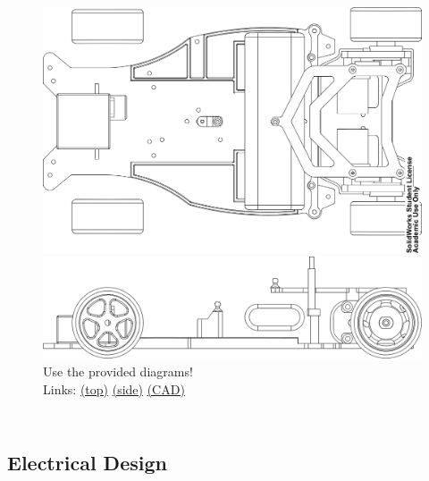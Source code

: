 \documentclass{beamer}
\begin{document}
\begin{frame}
\begin{columns}[t]
\begin{figure}
  \centering
  \includegraphics[width=1.0\columnwidth]{images-dis2/car-raster-top} \\
  \includegraphics[width=1.0\columnwidth]{images-dis2/car-raster-side} \\
  Use the provided diagrams! \\
  Links:
  {\tiny
  \href{http://www-inst.eecs.berkeley.edu/~ee192/sp15/files/chassis-sketch-top-view.pdf}{(top)}
  \href{http://www-inst.eecs.berkeley.edu/~ee192/sp15/files/chassis-sketch-side-view.pdf}{(side)}
  \href{http://www-inst.eecs.berkeley.edu/~ee192/sp15/files/freescale_chassis_cad_sw.zip}{(CAD)}
  }
\end{figure}
\end{columns}
\end{frame}

\subsection{Electrical Design}
\end{document}
